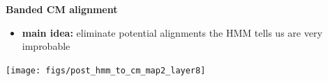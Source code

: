 \documentclass[landscape]{slides}
\begin{document}
\begin{slide}
\begin{center}
\large
\textbf{Banded CM alignment}
\end{center}
\medskip
\small
\begin{itemize}
\item
\textbf{main idea:} eliminate potential alignments the HMM tells us are very improbable
\end{itemize}
\begin{center}
\texttt{[image: figs/post\_hmm\_to\_cm\_map2\_layer8]}
\end{center}
\vfill
\end{slide}
\end{document}
